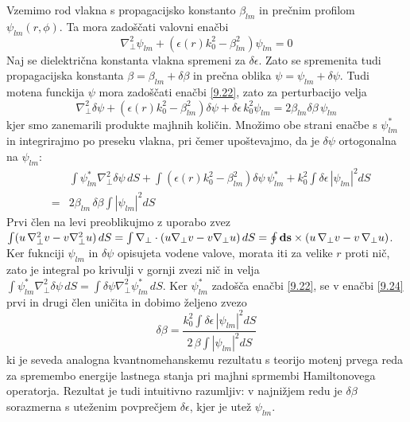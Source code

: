 Vzemimo rod vlakna s propagacijsko konstanto $\beta_{lm}$ in prečnim
profilom $\psi_{lm}\left(r,\phi\right).$ Ta mora zadoščati valovni
enačbi 
\begin{equation}
\nabla_{\bot}^{2}\psi_{lm}+\left(\epsilon(r)k_{0}^{2}-\beta_{lm}^{2}\right)\psi_{lm}=0\label{9.22}
\end{equation}
 Naj se dielektrična konstanta vlakna spremeni za $\delta\epsilon.$
Zato se spremenita tudi propagacijska konstanta $\beta=\beta_{lm}+\delta\beta$
in prečna oblika $\psi=\psi_{lm}+\delta\psi.$ Tudi motena funckija
$\psi$ mora zadoščati enačbi \ref{9.22}, zato za perturbacijo velja
\begin{equation}
\nabla_{\bot}^{2}\delta\psi+\left(\epsilon(r)k_{0}^{2}-\beta_{lm}^{2}\right)\delta\psi+\delta\epsilon\, k_{0}^{2}\psi_{lm}=2\beta_{lm}\delta\beta\,\psi_{lm}\label{9.23}
\end{equation}
 kjer smo zanemarili produkte majhnih količin. Množimo obe strani
enačbe s $\psi_{lm}^{*}$ in integrirajmo po preseku vlakna, pri čemer
upoštevajmo, da je $\delta\psi$ ortogonalna na $\psi_{lm}$: 
\begin{eqnarray}
 &  & \int\psi_{lm}^{*}\nabla_{\bot}^{2}\delta\psi\, dS+\int\left(\epsilon(r)k_{0}^{2}-\beta_{lm}^{2}\right)\delta\psi\,\psi_{lm}^{*}+k_{0}^{2}\int\delta\epsilon\,\left|\psi_{lm}\right|^{2}dS\label{9.24}\\
 & = & 2\beta_{lm}\,\delta\beta\int\left|\psi_{lm}\right|^{2}dS
\end{eqnarray}
 Prvi člen na levi preoblikujmo z uporabo zvez $\int(u\,\nabla_{\bot}^{2}v-v\nabla_{\bot}^{2}u)\, dS=\int\nabla_{\bot}\cdot(u\nabla_{\bot}v-v\nabla_{\bot}u)\, dS=\oint{\bf ds\times(}u\,\nabla_{\bot}v-v\,\nabla_{\bot}u)$.
Ker fuknciji $\psi_{lm}$ in $\delta\psi$ opisujeta vodene valove,
morata iti za velike $r$ proti nič, zato je integral po krivulji
v gornji zvezi nič in velja $\int\psi_{lm}^{*}\nabla_{\bot}^{2}\delta\psi\, dS=\int\delta\psi\nabla_{\bot}^{2}\psi_{lm}^{*}\, dS$.
Ker $\psi_{lm}^{*}$ zadošča enačbi \ref{9.22}, se v enačbi \ref{9.24}
prvi in drugi člen uničita in dobimo željeno zvezo 
\begin{equation}
\delta\beta=\frac{k_{0}^{2}\int\delta\epsilon\,\left|\psi_{lm}\right|^{2}dS}{2\,\beta\int\left|\psi_{lm}\right|^{2}dS}\label{9.25}
\end{equation}
 ki je seveda analogna kvantnomehanskemu rezultatu s teorijo motenj
prvega reda za spremembo energije lastnega stanja pri majhni sprmembi
Hamiltonovega operatorja. Rezultat je tudi intuitivno razumljiv: v
najnižjem redu je $\delta\beta$ sorazmerna s uteženim povprečjem
$\delta\epsilon$, kjer je utež $\psi_{lm}$.

